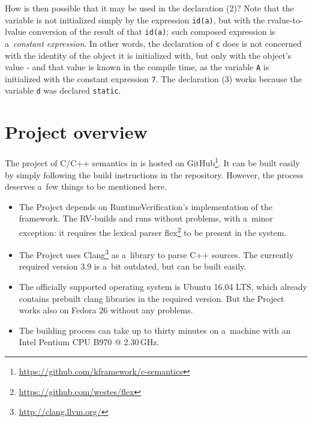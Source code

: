 \documentclass[nolot,nolof,nocover,printed]{fithesis3}
\begin{document}
How is then possible that it may be used in the declaration (2)? Note that the variable is not initialized simply by the expression \lstinline|id(a)|, but with the rvalue-to-lvalue conversion of the result of that \lstinline|id(a)|; such composed expression is a~\textit{constant expression}. In other words, the declaration of \lstinline|c| does is not concerned with the identity of the object it is initialized with, but only with the object's value - and that value is known in the compile time, as the variable \lstinline|A| is initialized with the constant expression \lstinline|7|. The declaration (3) works because the variable \lstinline|d| was declared \lstinline|static|.





\chapter{Project overview}

The project of C/C++ semantics in \K is hosted on GitHub\footnote{\url{https://github.com/kframework/c-semantics}}. It can be built easily by simply following the build instructions in the repository. However, the process deserves a~few things to be mentioned here.

\begin{itemize}
\item The Project depends on RuntimeVerification's implementation of the \K framework. The RV-\K builds and runs without problems, with a~minor exception: it requires the lexical parser flex\footnote{\url{https://github.com/westes/flex}} to be present in the system.
\item The Project uses Clang\footnote{\url{http://clang.llvm.org/}} as a~library to parse C++ sources. The currently required version 3.9 is a~bit outdated, but can be built easily.
\item The officially supported operating system is Ubuntu 16.04 LTS, which already contains prebuilt clang libraries in the required version. But the Project works also on Fedora 26 without any problems.
\item The building process can take up to thirty minutes on a~machine with an Intel Pentium CPU B970 @ 2.30\,GHz.
\end{itemize}
\end{document}
